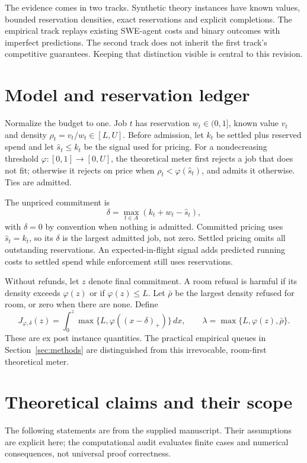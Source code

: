 \documentclass[11pt]{article}
\begin{document}
The evidence comes in two tracks. Synthetic theory instances have known values, bounded reservation densities, exact reservations and explicit completions. The empirical track replays existing SWE-agent costs and binary outcomes with imperfect predictions. The second track does not inherit the first track's competitive guarantees. Keeping that distinction visible is central to this revision.

\section{Model and reservation ledger}
Normalize the budget to one. Job $t$ has reservation $w_t\in(0,1]$, known value $v_t$ and density $\rho_t=v_t/w_t\in[L,U]$. Before admission, let $k_t$ be settled plus reserved spend and let $\widehat s_t\le k_t$ be the signal used for pricing. For a nondecreasing threshold $\varphi:[0,1]\to[0,U]$, the theoretical meter first rejects a job that does not fit; otherwise it rejects on price when $\rho_t<\varphi(\widehat s_t)$, and admits it otherwise. Ties are admitted.

The unpriced commitment is
\[\delta=\max_{t\in A}(k_t+w_t-\widehat s_t),\]
with $\delta=0$ by convention when nothing is admitted. Committed pricing uses $\widehat s_t=k_t$, so its $\delta$ is the largest admitted job, not zero. Settled pricing omits all outstanding reservations. An expected-in-flight signal adds predicted running costs to settled spend while enforcement still uses reservations.

Without refunds, let $z$ denote final commitment. A room refusal is harmful if its density exceeds $\varphi(z)$ or if $\varphi(z)\le L$. Let $\bar\rho$ be the largest density refused for room, or zero when there are none. Define
\[J_{\varphi,\delta}(z)=\int_0^z\max\{L,\varphi((x-\delta)_+)\}\,dx,\qquad
\lambda=\max\{L,\varphi(z),\bar\rho\}.\]
These are ex post instance quantities. The practical empirical queues in Section~\ref{sec:methods} are distinguished from this irrevocable, room-first theoretical meter.

\section{Theoretical claims and their scope}
The following statements are from the supplied manuscript. Their assumptions are explicit here; the computational audit evaluates finite cases and numerical consequences, not universal proof correctness.
\end{document}
